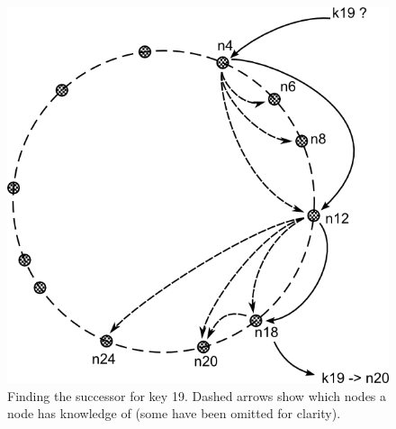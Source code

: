 \documentclass{article}
\begin{document}
\begin{figure}
\centering
\includegraphics{chord_find-successor.png}
\caption[caption]{Finding the successor for key 19. Dashed arrows show which nodes a node has knowledge of (some have been omitted for clarity).}
\label{fig:chord_succ}
\end{figure}
\end{document}
